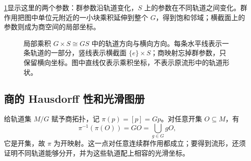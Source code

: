 \cref{g1:fig:free-action-product}显示这里的两个参数：群参数沿轨道变化，\(S\) 上的参数在不同轨道之间变化。群作用把图中单位元附近的一小块乘积延伸到整个 \(G\)，得到饱和邻域；横截面上的参数则成为商空间的局部坐标。

\begin{figure}[htbp]
	\centering
	
	\caption[自由固有作用的局部乘积]{局部乘积 \(G\times S\cong GS\) 中的轨道方向与横向方向。每条水平线表示一条轨道的一部分，竖线表示横截面 \(\{e\}\times S\)；商映射忘掉群参数，只保留横向坐标。图中直线仅表示乘积坐标，不表示原流形中的轨道形状。}
	\label{g1:fig:free-action-product}
\end{figure}

\subsection{商的 Hausdorff 性和光滑图册}
\label{g1:subsec:1702:03}

给轨道集 \(M/G\) 赋予商拓扑，记 \(\pi(p)=[p]=Gp\)。对任意开集 \(O\subseteq M\)，有
\[
	\pi^{-1}(\pi(O))=GO=\bigcup_{g\in G}gO,
\]
它是开集，故 \(\pi\) 为开映射。这一点对任意连续群作用都成立；要得到流形，还须证明不同轨道能够分开，并为这些轨道配上相容的光滑坐标。

